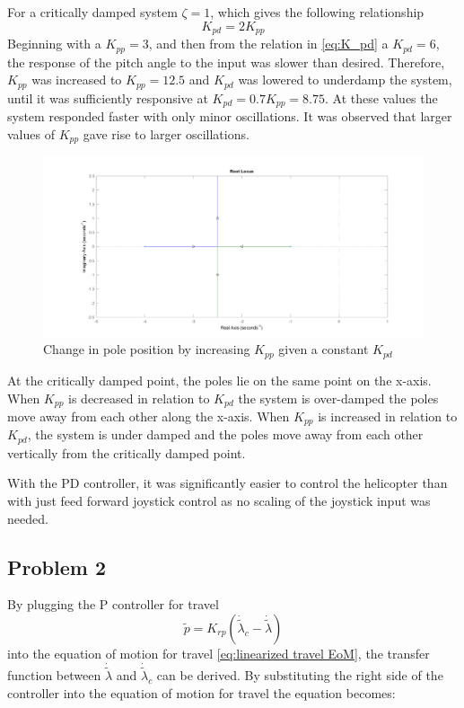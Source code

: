 %
For a critically damped system $\zeta = 1$, which gives the following
relationship
%
\begin{equation}
  \label{eq:K_pd}
  K_{pd} = 2K_{pp}
\end{equation}
%
Beginning with a $K_{pp} = 3$, and then from the relation in
\cref{eq:K_pd} a $K_{pd} = 6$, the response of the pitch angle
to the input was slower than desired. Therefore, $K_{pp}$ was
increased to $K_{pp} = 12.5$ and $K_{pd}$ was lowered to underdamp the
system, until it  was sufficiently responsive at $K_{pd} = 0.7K_{pp} =
8.75$. At these values the system responded faster with only minor
oscillations. It was observed that larger values of $K_{pp}$ gave rise
to larger oscillations.
%
\begin{figure}[H]
  \caption{Change in pole position by increasing $K_{pp}$ given a
    constant $K_{pd}$}
  \label{fig:Root_Locus}
  \includegraphics[width=\textwidth]{images/Root_Locus}
\end{figure}
%
At the critically damped point, the poles lie on the same point on
the x-axis. When $K_{pp}$ is decreased in relation to $K_{pd}$ the
system is over-damped the poles move away from each other along the
x-axis. When $K_{pp}$ is increased in relation to $K_{pd}$, the system
is under damped and the poles move away from each other vertically
from the critically damped point.

With the PD controller, it was significantly easier to control the
helicopter than with just feed forward joystick control as no scaling
of the joystick input was needed.

\subsection{Problem 2}
By plugging the P controller for travel
\begin{equation}
\label{travel P controller}
\tilde{p} = K_{rp}(\dot{\tilde{\lambda}}_c - \dot{\tilde{\lambda}})
\end{equation}
into the equation of motion for travel \cref{eq:linearized travel
  EoM}, the transfer function between $\dot{\tilde{\lambda}}$ and
$\dot{\tilde{\lambda}}_c$  can be derived. By substituting the right
side of the controller into the equation of motion for travel the
equation becomes:

